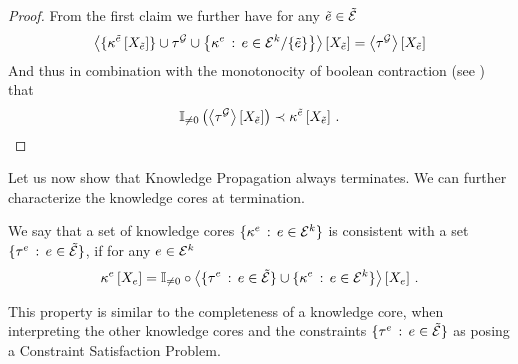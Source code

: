 \begin{proof}
    From the first claim we further have for any $\tilde{e}\in\tilde{\mathcal{E}}$
    \begin{align*}
        \left\langle \{\kappa^{\tilde{e}}\left[X_{\tilde{e}}\right]\}\cup\tau^{\mathcal{G}} \cup \left\{\kappa^{e} \, : \, e\in\mathcal{E}^{k}/\{\tilde{e}\}\right\}\right\rangle \left[ X_{\tilde{e}} \right]
        = \left\langle \tau^{\mathcal{G}}\right\rangle \left[ X_{\tilde{e}} \right]
    \end{align*}
    And thus in combination with the monotonocity of boolean contraction (see ) that
    \begin{align*}
        \mathbb{I}_{\neq0}\left(\left\langle \tau^{\mathcal{G}}\right\rangle \left[ X_{\tilde{e}} \right]\right) \prec \kappa^{\tilde{e}}\left[X_{\tilde{e}}\right]  \, .
    \end{align*}
\end{proof}

Let us now show that Knowledge Propagation always terminates.
We can further characterize the knowledge cores at termination.

\begin{definition}
    We say that a set of knowledge cores $\{\kappa^{e} \, : \, e\in\mathcal{E}^{k}\}$ is consistent with a set $\{\tau^{e} \, : \, e\in\tilde{\mathcal{E}}\}$, if for any $e\in\mathcal{E}^{k}$
    \begin{align*}
        \kappa^{e}\left[X_{e}\right]
        = \mathbb{I}_{\neq0}\circ\left\langle \{\tau^{e} \, : \, e\in\tilde{\mathcal{E}}\} \cup \{\kappa^{e} \, : \, e\in\mathcal{E}^{k}\}\right\rangle \left[ X_{e} \right] \, .
    \end{align*}
\end{definition}

This property is similar to the completeness of a knowledge core, when interpreting the other knowledge cores and the constraints $\{\tau^{e} \, : \, e\in\tilde{\mathcal{E}}\}$ as posing a Constraint Satisfaction Problem.

